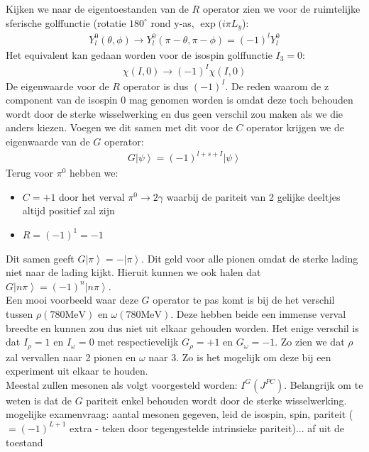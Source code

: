 \documentclass[../main.tex]{subfiles}
\begin{document}
Kijken we naar de eigentoestanden van de $R$ operator zien we voor de ruimtelijke sferische golffunctie (rotatie $180^\circ$ rond y-as, $\exp(i\pi L_y$):
\begin{equation}
    \begin{aligned}
        \label{eq:ruimte_y_rotatie}
        Y_l^0(\theta, \phi) \rightarrow Y_l^0(\pi - \theta, \pi - \phi) = (-1)^lY_l^0
    \end{aligned}
\end{equation}
Het equivalent kan gedaan worden voor de isospin golffunctie $I_3=0$:
\begin{equation}
    \begin{aligned}
        \label{eq:isospin_y_rotatie}
        \chi(I,0) \rightarrow (-1)^I\chi(I,0)
    \end{aligned}
\end{equation}
De eigenwaarde voor de $R$ operator is dus $(-1)^I$. De reden waarom de z component van de isospin $0$ mag genomen worden is omdat deze toch behouden wordt door de sterke wisselwerking en dus geen verschil zou maken als we die anders kiezen. Voegen we dit samen met dit voor de $C$ operator krijgen we de eigenwaarde van de $G$ operator:
\begin{equation}
    \begin{aligned}
        \label{eq:eigenwaarde_g}
        G\left|\psi\right>=(-1)^{l+s+I}\left|\psi\right>
    \end{aligned}
\end{equation}
Terug voor $\pi^0$ hebben we:
\begin{itemize}
    \item $C=+1$ door het verval $\pi^0\rightarrow2\gamma$ waarbij de pariteit van 2 gelijke deeltjes altijd positief zal zijn
    \item $R=(-1)^1=-1$
\end{itemize}
Dit samen geeft $G\left|\pi\right>=-\left|\pi\right>$. Dit geld voor alle pionen omdat de sterke lading niet naar de lading kijkt. Hieruit kunnen we ook halen dat $G\left|n\pi\right>=(-1)^n\left|n\pi\right>$.\\
Een mooi voorbeeld waar deze $G$ operator te pas komt is bij de het verschil tussen $\rho(780\text{MeV})$ en $\omega(780\text{MeV})$. Deze hebben beide een immense verval breedte en kunnen zou dus niet uit elkaar gehouden worden. Het enige verschil is dat $I_\rho=1$ en $I_\omega=0$ met respectievelijk $G_\rho=+1$ en $G_\omega=-1$. Zo zien we dat $\rho$ zal vervallen naar 2 pionen en $\omega$ naar 3. Zo is het mogelijk om deze bij een experiment uit elkaar te houden.\\
Meestal zullen mesonen als volgt voorgesteld worden: $I^G(J^{PC})$. Belangrijk om te weten is dat de $G$ pariteit enkel behouden wordt door de sterke wisselwerking.\\

{\color{red} mogelijke examenvraag: aantal mesonen gegeven, leid de isospin, spin, pariteit ($=(-1)^{L+1}$ extra - teken door tegengestelde intrinsieke pariteit)... af uit de toestand}
\end{document}
